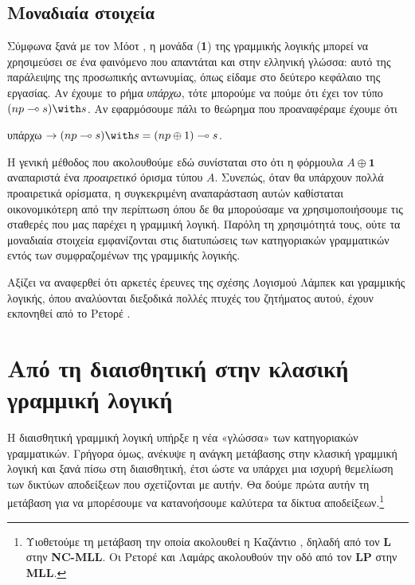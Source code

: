 \documentclass [a4paper,11pt] {book}
\theoremstyle{definition}
\theoremstyle{definition}
\newenvironment{note}[1][Σημείωση]{\begin{trivlist}
\item[\hskip \labelsep {\bfseries #1}]}{\end{trivlist}}
\begin{document}
\subsection*{Μοναδιαία στοιχεία}
Σύμφωνα ξανά με τον Μόοτ \citep{moot2002proof}, η μονάδα (\textbf{1}) της γραμμικής λογικής μπορεί να χρησιμεύσει σε ένα φαινόμενο που απαντάται και στην ελληνική γλώσσα: αυτό της παράλειψης της προσωπικής αντωνυμίας, όπως είδαμε στο δεύτερο κεφάλαιο της εργασίας. Αν έχουμε το ρήμα \textit{υπάρχω}, τότε μπορούμε να πούμε ότι έχει τον τύπο $(np\multimap s)\with s$. Αν εφαρμόσουμε πάλι το θεώρημα που προαναφέραμε έχουμε ότι
\begin{center}
υπάρχω $\to (np\multimap s)\with s = (np\oplus 1)\multimap s $.
\end{center}
Η γενική μέθοδος που ακολουθούμε εδώ συνίσταται στο ότι η φόρμουλα $A\oplus \textbf{1}$ αναπαριστά ένα \textit{προαιρετικό} όρισμα τύπου $A$. Συνεπώς, όταν θα υπάρχουν πολλά προαιρετικά ορίσματα, η συγκεκριμένη αναπαράσταση αυτών καθίσταται οικονομικότερη από την περίπτωση όπου δε θα μπορούσαμε να χρησιμοποιήσουμε τις σταθερές που μας παρέχει η γραμμική λογική. Παρόλη τη χρησιμότητά τους, ούτε τα μοναδιαία στοιχεία εμφανίζονται στις διατυπώσεις των κατηγοριακών γραμματικών εντός των συμφραζομένων της γραμμικής λογικής.
\begin{note}
Αξίζει να αναφερθεί ότι αρκετές έρευνες της σχέσης Λογισμού Λάμπεκ και γραμμικής λογικής, όπου αναλύονται διεξοδικά πολλές πτυχές του ζητήματος αυτού, έχουν εκπονηθεί από το Ρετορέ \citep{Retore02}\citep{citeulike:1224022}.
\end{note}
\section{Από τη διαισθητική στην κλασική γραμμική λογική}
Η διαισθητική γραμμική λογική υπήρξε η νέα «γλώσσα» των κατηγοριακών γραμματικών. Γρήγορα όμως, ανέκυψε η ανάγκη μετάβασης στην κλασική γραμμική λογική και ξανά πίσω στη διαισθητική, έτσι ώστε να υπάρχει μια ισχυρή θεμελίωση των δικτύων αποδείξεων που σχετίζονται με αυτήν. Θα δούμε πρώτα αυτήν τη μετάβαση για να μπορέσουμε να κατανοήσουμε καλύτερα τα δίκτυα αποδείξεων.\footnote{Υιοθετούμε τη μετάβαση την οποία ακολουθεί η Καζάντιο \citep{Casadio01}, δηλαδή από τον \textbf{L} στην \textbf{NC-MLL}. Οι Ρετορέ και Λαμάρς \citep{Lamarche96proofnets} ακολουθούν την οδό από τον \textbf{LP} στην \textbf{MLL}.}
\end{document}
